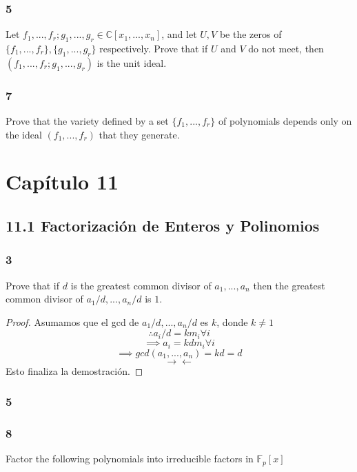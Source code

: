 \documentclass[11pt]{article}
\newcommand{\set}[1]{\mathbb{#1}}
\newcommand{\contr}{\rightarrow\leftarrow}
\theoremstyle{definition}
\begin{document}
        \subsubsection{5}
        Let $f_1,...,f_r;g_1,...,g_r\in\set{C}[x_1,...,x_n]$, and let $U,V$ be the zeros of $\{f_1,...,f_r\},\{g_1,...,g_r\}$ respectively. Prove that if $U$ and $V$ do not meet, then $(f_1,...,f_r;g_1,...,g_r)$ is the unit ideal.

        \subsubsection{7}
        Prove that the variety defined by a set $\{f_1,...,f_r\}$ of polynomials depends only on the ideal $(f_1,...,f_r)$ that they generate.

        \section{Capítulo 11}
        \subsection{11.1 Factorización de Enteros y Polinomios}
        \subsubsection{3}
        Prove that if $d$ is the greatest common divisor of $a_1,...,a_n$ then the greatest common divisor of $a_1/d,...,a_n/d$ is $1$.
        \begin{proof}
            Asumamos que el gcd de $a_1/d,...,a_n/d$ es $k$, donde $k\neq 1$
            \[\therefore a_i/d=km_i\forall i\]
            \[\implies a_i=kdm_i\forall i\]
            \[\implies gcd(a_1,...,a_n)=kd=d\]
            \[\contr\]
            Esto finaliza la demostración.
        \end{proof}

        \subsubsection{5}

        \subsubsection{8}
        Factor the following polynomials into irreducible factors in $\set{F}_p[x]$
    
\end{document}
